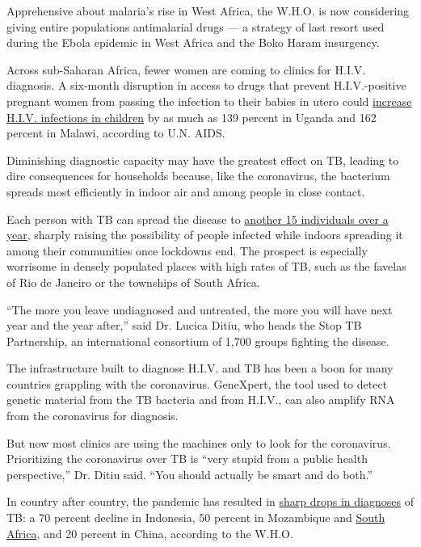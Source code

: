 Apprehensive about malaria's rise in West Africa, the W.H.O. is now
considering giving entire populations antimalarial drugs --- a strategy
of last resort used during the Ebola epidemic in West Africa and the
Boko Haram insurgency.

Across sub-Saharan Africa, fewer women are coming to clinics for H.I.V.
diagnosis. A six-month disruption in access to drugs that prevent
H.I.V.-positive pregnant women from passing the infection to their
babies in utero could
\href{https://reliefweb.int/report/world/estimation-potential-impact-covid-19-responses-hiv-epidemic-analysis-using-goals-model}{increase
H.I.V. infections in children} by as much as 139 percent in Uganda and
162 percent in Malawi, according to U.N. AIDS.

Diminishing diagnostic capacity may have the greatest effect on TB,
leading to dire consequences for households because, like the
coronavirus, the bacterium spreads most efficiently in indoor air and
among people in close contact.

Each person with TB can spread the disease to
\href{https://www.who.int/news-room/fact-sheets/detail/tuberculosis}{another
15 individuals over a year}, sharply raising the possibility of people
infected while indoors spreading it among their communities once
lockdowns end. The prospect is especially worrisome in densely populated
places with high rates of TB, such as the favelas of Rio de Janeiro or
the townships of South Africa.

``The more you leave undiagnosed and untreated, the more you will have
next year and the year after,'' said Dr. Lucica Ditiu, who heads the
Stop TB Partnership, an international consortium of 1,700 groups
fighting the disease.

The infrastructure built to diagnose H.I.V. and TB has been a boon for
many countries grappling with the coronavirus. GeneXpert, the tool used
to detect genetic material from the TB bacteria and from H.I.V., can
also amplify RNA from the coronavirus for diagnosis.

But now most clinics are using the machines only to look for the
coronavirus. Prioritizing the coronavirus over TB is ``very stupid from
a public health perspective,'' Dr. Ditiu said. ``You should actually be
smart and do both.''

In country after country, the pandemic has resulted in
\href{https://www.medrxiv.org/content/10.1101/2020.04.28.20079582v1}{sharp
drops in diagnoses} of TB: a 70 percent decline in Indonesia, 50 percent
in Mozambique and
\href{https://www.nicd.ac.za/wp-content/uploads/2020/05/Impact-of-Covid-19-interventions-on-TB-testing-in-South-Africa-10-May-2020.pdf}{South
Africa}, and 20 percent in China, according to the W.H.O.


